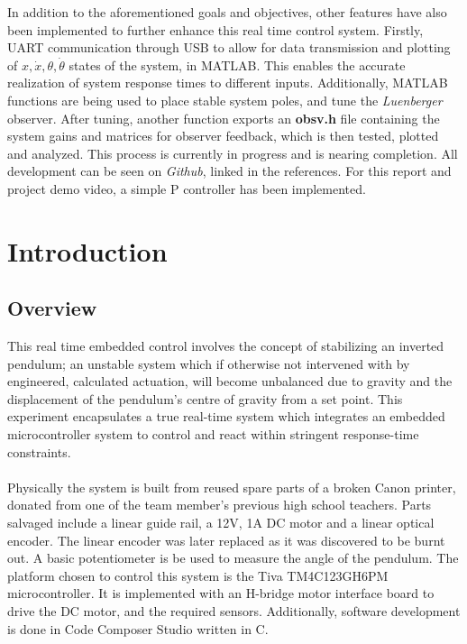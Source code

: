 \documentclass[12pt]{article}
\begin{document}
In addition to the aforementioned goals and objectives, other features have also been implemented to further enhance this real time control system. Firstly, UART communication through USB to allow for data transmission and plotting of $x, \dot{x}, \theta, \dot{\theta}$ states of the system, in MATLAB. This enables the accurate realization of system response times to different inputs. Additionally, MATLAB functions are being used to place stable system poles, and tune the \textit{Luenberger} observer. After tuning, another function exports an \textbf{obsv.h} file containing the system gains and matrices for observer feedback, which is then tested, plotted and analyzed. This process is currently in progress and is nearing completion. All development can be seen on \textit{Github}, linked in the references. For this report and project demo video, a simple P controller has been implemented.

\newpage
\tableofcontents
\listoffigures
\newpage

\section{Introduction}
\subsection{Overview}
This real time embedded control involves the concept of stabilizing an inverted pendulum; an unstable system which if otherwise not intervened with by engineered, calculated actuation, will become unbalanced due to gravity and the displacement of the pendulum's centre of gravity from a set point. This experiment encapsulates a true real-time system which integrates an embedded microcontroller system to control and react within stringent response-time constraints.
\\\\
Physically the system is built from reused spare parts of a broken Canon printer, donated from one of the team member's previous high school teachers. Parts salvaged include a linear guide rail, a 12V, 1A DC motor and a linear optical encoder. The linear encoder was later replaced as it was discovered to be burnt out. A basic potentiometer is be used to measure the angle of the pendulum. The platform chosen to control this system is the Tiva TM4C123GH6PM microcontroller. It is implemented with an H-bridge motor interface board to drive the DC motor, and the required sensors. Additionally, software development is done in Code Composer Studio written in C.
\end{document}
